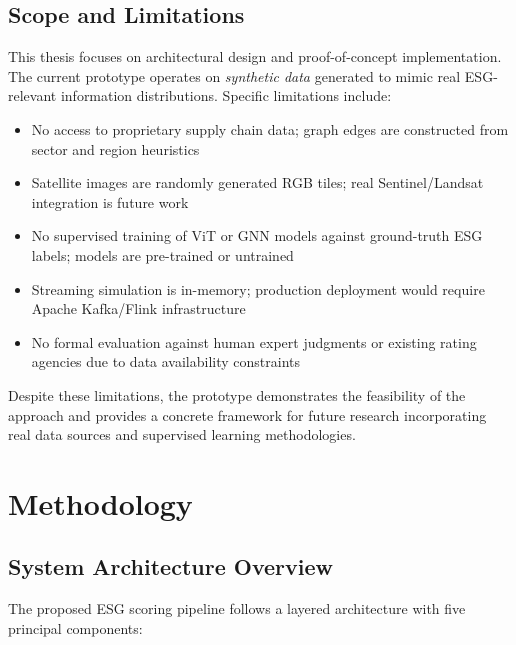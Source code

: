 \subsection{Scope and Limitations}

This thesis focuses on architectural design and proof-of-concept implementation. The current prototype operates on \textit{synthetic data} generated to mimic real ESG-relevant information distributions. Specific limitations include:

\begin{itemize}
\item No access to proprietary supply chain data; graph edges are constructed from sector and region heuristics
\item Satellite images are randomly generated RGB tiles; real Sentinel/Landsat integration is future work
\item No supervised training of ViT or GNN models against ground-truth ESG labels; models are pre-trained or untrained
\item Streaming simulation is in-memory; production deployment would require Apache Kafka/Flink infrastructure
\item No formal evaluation against human expert judgments or existing rating agencies due to data availability constraints
\end{itemize}

Despite these limitations, the prototype demonstrates the feasibility of the approach and provides a concrete framework for future research incorporating real data sources and supervised learning methodologies.

\clearpage
\section{Methodology}
\label{sec:methodology}

\subsection{System Architecture Overview}

The proposed ESG scoring pipeline follows a layered architecture with five principal components:

